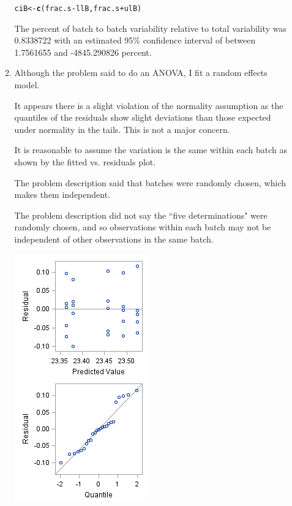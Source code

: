 \documentclass{article}\usepackage[]{graphicx}\usepackage[]{color}
\makeatletter
\newcommand{\hlopt}[1]{\textcolor[rgb]{0,0,0}{#1}}%
\newcommand{\hlstd}[1]{\textcolor[rgb]{0.345,0.345,0.345}{#1}}%
\newcommand{\hlkwb}[1]{\textcolor[rgb]{0.69,0.353,0.396}{#1}}%
\newcommand{\hlkwd}[1]{\textcolor[rgb]{0.737,0.353,0.396}{\textbf{#1}}}%
\newenvironment{kframe}{%
 \def\at@end@of@kframe{}%
 \ifinner\ifhmode%
  \def\at@end@of@kframe{\end{minipage}}%
  \begin{minipage}{\columnwidth}%
 \fi\fi%
 \def\FrameCommand##1{\hskip\@totalleftmargin \hskip-\fboxsep
 \colorbox{shadecolor}{##1}\hskip-\fboxsep
     \hskip-\linewidth \hskip-\@totalleftmargin \hskip\columnwidth}%
 \MakeFramed {\advance\hsize-\width
   \@totalleftmargin\z@ \linewidth\hsize
   \@setminipage}}%
 {\par\unskip\endMakeFramed%
 \at@end@of@kframe}
\newenvironment{knitrout}{}{} %
\makeatother
\begin{document}
\begin{enumerate}
\begin{enumerate}
\begin{knitrout}
\begin{kframe}
\begin{alltt}
\hlstd{ciB} \hlkwb{<-} \hlkwd{c}\hlstd{(frac.s}\hlopt{-}\hlstd{llB,frac.s}\hlopt{+}\hlstd{ulB)}
\end{alltt}
\end{kframe}
\end{knitrout}

The percent of batch to batch variability relative to total variability was 0.8338722 with an estimated 95\% confidence interval of between 1.7561655 and -4845.290826 percent.



\item %

Although the problem said to do an ANOVA, I fit a random effects model.

It appears there is a slight violation of the normality assumption as the quantiles of the residuals show slight deviations than those expected under normality in the tails. This is not a major concern.

It is reasonable to assume the variation is the same within each batch as shown by the fitted vs. residuals plot.

The problem description said that batches were randomly chosen, which makes them independent.

The problem description did not say the ``five determinations" were randomly chosen, and so observations within each batch may not be independent of other observations in the same batch.

\includegraphics[scale=0.5]{prob3plots}


\end{enumerate}


\end{enumerate}
\end{document}
